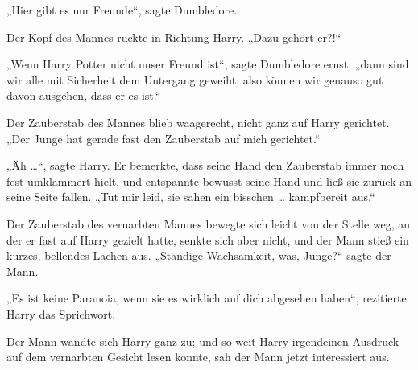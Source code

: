 „Hier gibt es nur Freunde“, sagte Dumbledore.

Der Kopf des Mannes ruckte in Richtung Harry.
„Dazu gehört er?!“

„Wenn Harry Potter nicht unser Freund ist“, sagte Dumbledore ernst, „dann sind wir alle mit Sicherheit dem Untergang geweiht; also können wir genauso gut davon ausgehen, dass er es ist.“

Der Zauberstab des Mannes blieb waagerecht, nicht ganz auf Harry gerichtet.
„Der Junge hat gerade fast den Zauberstab auf mich gerichtet.“

„Äh …“, sagte Harry. Er bemerkte, dass seine Hand den Zauberstab immer noch fest umklammert hielt, und entspannte bewusst seine Hand und ließ sie zurück an seine Seite fallen.
„Tut mir leid, sie sahen ein bisschen … kampfbereit aus.“

Der Zauberstab des vernarbten Mannes bewegte sich leicht von der Stelle weg, an der er fast auf Harry gezielt hatte, senkte sich aber nicht, und der Mann stieß ein kurzes, bellendes Lachen aus.
„Ständige Wachsamkeit, was, Junge?“ sagte der Mann.

„Es ist keine Paranoia, wenn sie es wirklich auf dich abgesehen haben“, rezitierte Harry das Sprichwort.

Der Mann wandte sich Harry ganz zu; und so weit Harry irgendeinen Ausdruck auf dem vernarbten Gesicht lesen konnte, sah der Mann jetzt interessiert aus.

